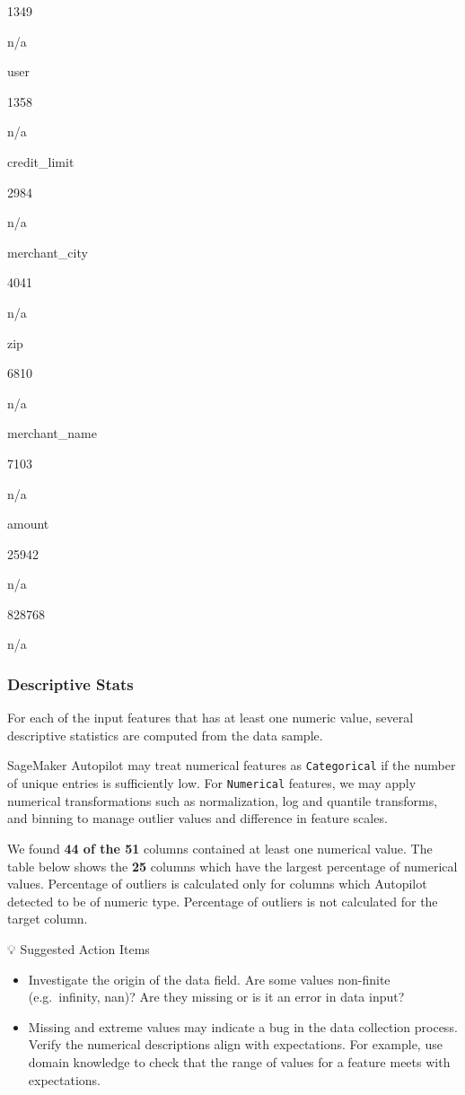 \documentclass[11pt]{article}
\providecommand{\tightlist}{%
      \setlength{\itemsep}{0pt}\setlength{\parskip}{0pt}}
\begin{document}
1349

n/a

user

1358

n/a

credit\_limit

2984

n/a

merchant\_city

4041

n/a

zip

6810

n/a

merchant\_name

7103

n/a

amount

25942

n/a

828768

n/a

    \hypertarget{descriptive-stats}{%
\subsubsection{Descriptive Stats}\label{descriptive-stats}}

For each of the input features that has at least one numeric value,
several descriptive statistics are computed from the data sample.

SageMaker Autopilot may treat numerical features as \texttt{Categorical}
if the number of unique entries is sufficiently low. For
\texttt{Numerical} features, we may apply numerical transformations such
as normalization, log and quantile transforms, and binning to manage
outlier values and difference in feature scales.

We found \textbf{44 of the 51} columns contained at least one numerical
value. The table below shows the \textbf{25} columns which have the
largest percentage of numerical values. Percentage of outliers is
calculated only for columns which Autopilot detected to be of numeric
type. Percentage of outliers is not calculated for the target column.

💡 Suggested Action Items

\begin{itemize}
\tightlist
\item
  Investigate the origin of the data field. Are some values non-finite
  (e.g.~infinity, nan)? Are they missing or is it an error in data
  input?
\item
  Missing and extreme values may indicate a bug in the data collection
  process. Verify the numerical descriptions align with expectations.
  For example, use domain knowledge to check that the range of values
  for a feature meets with expectations.
\end{itemize}
\end{document}
